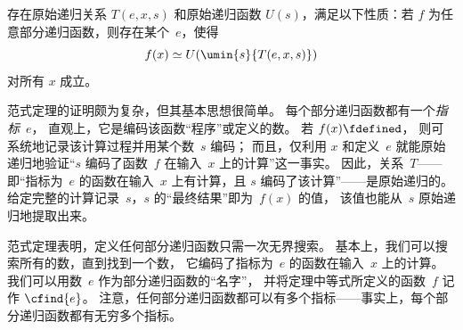 \documentclass[../../../include/open-logic-section]{subfiles}
\begin{document}

\begin{thm}
存在原始递归关系 $T(e, x, s)$ 和原始递归函数 $U(s)$，满足以下性质：若 $f$ 为任意部分递归函数，则存在某个~$e$，使得
\[
f(x) \simeq U(\umin{s}{T(e, x, s)})
\]
对所有 $x$ 成立。
\end{thm}

\begin{explain}
范式定理的证明颇为复杂，但其基本思想很简单。
每个部分递归函数都有一个\emph{指标}~$e$，
直观上，它是编码该函数“程序”或定义的数。
若 $f(x) \fdefined$，
则可系统地记录该计算过程并用某个数~$s$ 编码；
而且，仅利用 $x$ 和定义~$e$ 就能原始递归地验证“$s$ 编码了函数~$f$ 在输入~$x$ 上的计算”这一事实。
因此，关系~$T$——即“指标为~$e$ 的函数在输入~$x$ 上有计算，且 $s$ 编码了该计算”——是原始递归的。
给定完整的计算记录~$s$，$s$ 的“最终结果”即为~$f(x)$ 的值，
该值也能从~$s$ 原始递归地提取出来。

范式定理表明，定义任何部分递归函数只需一次无界搜索。
基本上，我们可以搜索所有的数，直到找到一个数，
它编码了指标为~$e$ 的函数在输入~$x$ 上的计算。
我们可以用数~$e$ 作为部分递归函数的“名字”，
并将定理中等式所定义的函数~$f$ 记作 $\cfind{e}$。
注意，任何部分递归函数都可以有多个指标——事实上，每个部分递归函数都有无穷多个指标。
\end{explain}
\end{document}
